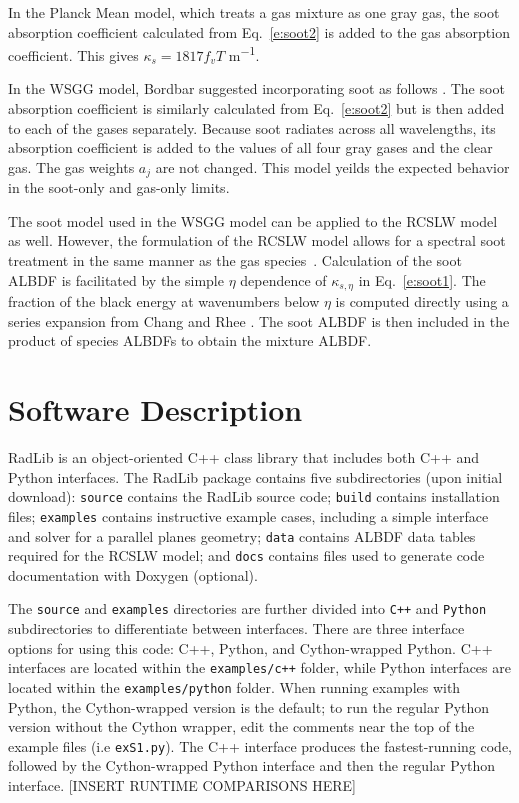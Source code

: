 \documentclass[preprint,12pt]{elsarticle}
\newcounter{bla}
\begin{document}
In the Planck Mean model, which treats a gas mixture as one gray gas, the soot absorption coefficient calculated from Eq.~\ref{e:soot2} is added to the gas absorption coefficient. This gives $\kappa_s=1817f_vT$ \si{m^{-1}}.
 
In the WSGG model, Bordbar suggested incorporating soot as follows \cite{Bordbar_personal}. The soot absorption coefficient is similarly calculated from Eq.~\ref{e:soot2} but is then added to each of the gases separately. Because soot radiates across all wavelengths, its absorption coefficient is added to the values of all four gray gases and the clear gas. The gas weights $a_j$ are not changed. This model yeilds the expected behavior in the soot-only and gas-only limits.

The soot model used in the WSGG model can be applied to the RCSLW model as well. However, the formulation of the RCSLW model allows for a spectral soot treatment in the same manner as the gas species~\cite{Solovjov_2001}. Calculation of the soot ALBDF is facilitated by the simple $\eta$ dependence of $\kappa_{s,\eta}$ in Eq.~\ref{e:soot1}. The fraction of the black energy at wavenumbers below $\eta$ is computed directly using a series expansion from Chang and Rhee \cite{Chang_1984,Solovjov_2001}. The soot ALBDF is then included in the product of species ALBDFs to obtain the mixture ALBDF. 
 

\section{Software Description} \label{s:architechture}

RadLib is an object-oriented C++ class library that includes both C++ and Python interfaces. The RadLib package contains five subdirectories (upon initial download): \texttt{source} contains the RadLib source code; \texttt{build} contains installation files; \texttt{examples} contains instructive example cases, including a simple interface and solver for a parallel planes geometry; \texttt{data} contains ALBDF data tables required for the RCSLW model; and \texttt{docs} contains files used to generate code documentation with Doxygen (optional). 

The \texttt{source} and \texttt{examples} directories are further divided into \texttt{C++} and \texttt{Python} subdirectories to differentiate between interfaces. There are three interface options for using this code: C++, Python, and Cython-wrapped Python. C++ interfaces are located within the \texttt{examples/c++} folder, while Python interfaces are located within the \texttt{examples/python} folder. When running examples with Python, the Cython-wrapped version is the default; to run the regular Python version without the Cython wrapper, edit the comments near the top of the example files (i.e \texttt{ex\textunderscore S1.py}). The C++ interface produces the fastest-running code, followed by the Cython-wrapped Python interface and then the regular Python interface. [INSERT RUNTIME COMPARISONS HERE]
\end{document}

